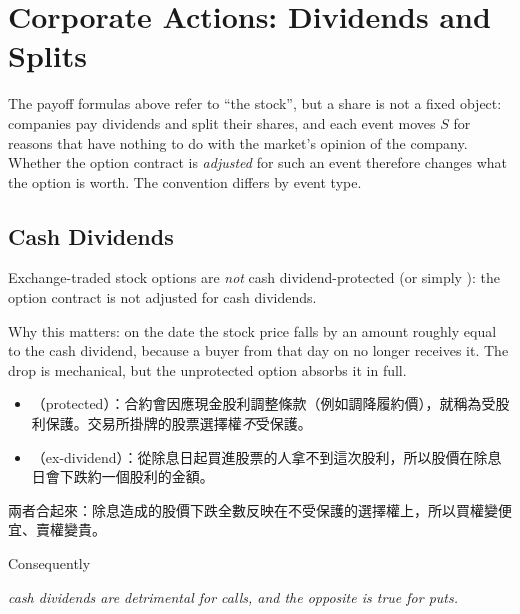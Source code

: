 \section{Corporate Actions: Dividends and Splits}
\label{sec:corporate-actions}

\suppstart
The payoff formulas above refer to ``the stock'', but a share is not a fixed object: companies pay dividends and split their shares, and each event moves $S$ for reasons that have nothing to do with the market's opinion of the company.
Whether the option contract is \emph{adjusted} for such an event therefore changes what the option is worth.
The convention differs by event type.
\suppend

\subsection{Cash Dividends}


Exchange-traded stock options are \emph{not} cash dividend-protected (or simply ): the option contract is not adjusted for cash dividends.

\suppstart
Why this matters: on the  date the stock price falls by an amount roughly equal to the cash dividend, because a buyer from that day on no longer receives it.
The drop is mechanical, but the unprotected option absorbs it in full.

\begin{remark}
	\begin{itemize}[nosep]
		\item {}（protected）：合約會因應現金股利調整條款（例如調降履約價），就稱為受股利保護。交易所掛牌的股票選擇權\emph{不}受保護。
		\item {}（ex-dividend）：從除息日起買進股票的人拿不到這次股利，所以股價在除息日會下跌約一個股利的金額。
	\end{itemize}
	兩者合起來：除息造成的股價下跌全數反映在不受保護的選擇權上，所以買權變便宜、賣權變貴。
\end{remark}
\suppend
Consequently

\begin{center}
	\emph{cash dividends are detrimental for calls, and the opposite is true for puts.}
\end{center}

